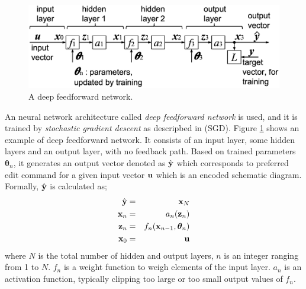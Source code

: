 \documentclass[twocolumn]{article}
\begin{document}
\begin{figure}[!tb]
 \begin{center}
  \begin{minipage}{\hsize}
   \includegraphics[width=\hsize]{fig/deep_feedforward_03.eps}
   \caption{A deep feedforward network.}
   \label{fig:deep_feedforward}
  \end{minipage}
 \end{center}
\end{figure}

An neural network architecture called {\it deep feedforward network} is used,
and it is trained by {\it stochastic gradient descent}
as descripbed in (SGD)\cite{mit}.
Figure \ref{fig:deep_feedforward} shows an example of deep feedforward network.
It consists of an input layer, some hidden layers and an output layer,
with no feedback path.
Based on trained parameters ${\bm \theta}_n$,
it generates an output vector denoted as $\hat{\bf y}$
which corresponds to preferred edit command for a given input vector
${\bf u}$ which is an encoded schematic diagram.
Formally, $\hat{\bf y}$ is calculated as;
\begin{eqnarray}
\hat{\bf y} &=& {\bf x}_N \\
{\bf x}_n &=& a_n({\bf z}_n) \\
{\bf z}_n &=& f_n({\bf x}_{n-1}, {\bm \theta}_n)\\
{\bf x}_0 &=& {\bf u}
\end{eqnarray}
where $N$ is the total number of hidden and output layers,
$n$ is an integer ranging from 1 to $N$.
$f_n$ is a weight function to weigh elements of the input layer.
$a_n$ is an activation function,
typically clipping too large or too small output values of $f_n$.
\end{document}
